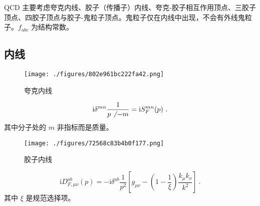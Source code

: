 

\begin{issues}
\issueMissDepend
\issueAbstract
\end{issues}

QCD 主要考虑夸克内线、胶子（传播子）内线、夸克-胶子相互作用顶点、三胶子顶点、四胶子顶点与胶子-鬼粒子顶点。鬼粒子仅在内线中出现，不会有外线鬼粒子。$f_{abc}$ 为结构常数。

\subsection{内线}
\begin{figure}[ht]
\centering
\texttt{[image: ./figures/802e961bc222fa42.png]}
\caption{夸克内线} \label{fig_qcdfey_1}
\end{figure}
\begin{equation}
\mathrm i \delta^{mn} \frac{1}{ p\not ~- m} = \mathrm i S^{mn}_F(p)~.
\end{equation}
其中分子处的 $m$ 非指标而是质量。

\begin{figure}[ht]
\centering
\texttt{[image: ./figures/72568c83b4b0f177.png]}
\caption{胶子内线} \label{fig_qcdfey_2}
\end{figure}
\begin{equation}
\mathrm i D_{F, \mu\nu}^{ab}(p) = -\mathrm i \delta^{ab} \frac{1}{p^2} \left[ g_{\mu\nu} - \left(1-\frac{1}{\xi}\right) \frac{k_\mu k_\nu}{k^2} \right] ~.
\end{equation}
其中 $\xi$ 是规范选择项。

